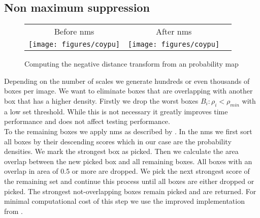 \subsection{Non maximum suppression}
\label{sec:pipeline:eval:nms}
\begin{figure}[htb]
    \begin{tabular}{ccc}
        Before \gls{nms} & After \gls{nms} \\[3pt]
        \texttt{[image: figures/coypu]} &
        \texttt{[image: figures/coypu]}
    \end{tabular}
	\caption{Computing the negative distance transform from an probability map}
    \label{fig:distance_transform}
\end{figure}
Depending on the number of scales we generate hundreds or even thousands of boxes per image. We want to eliminate boxes that are overlapping with another box that has a higher density. Firstly we drop the worst boxes $B_i: \rho_i < \rho_{min}$ with a low set threshold. While this is not necessary it greatly improves time performance and does not affect testing performance.\\To the remaining boxes we apply \gls{nms} as described by \citet{felzenszwalb_discriminatively_2008}. In the \gls{nms} we first sort all boxes by their descending scores which in our case are the probability densities. We mark the strongest box as picked. Then we calculate the area overlap between the new picked box and all remaining boxes. All boxes with an overlap in area of 0.5 or more are dropped. We pick the next strongest score of the remaining set and continue this process until all boxes are either dropped or picked. The strongest not-overlapping boxes remain picked and are returned. For minimal computational cost of this step we use the improved implementation from \citet{malisiewicz_ensemble_2011}.
